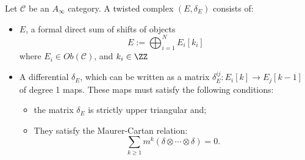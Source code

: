 
 
 
Let $\mathcal C$ be an $A_\infty$ category. A twisted complex $(E, \delta_E)$ consists of:
\begin{itemize}
\item $E$, a formal direct sum of shifts of objects
\[E:=\bigoplus_{i=1}^N E_i[k_i]\]
where $E_{i}\in Ob(\mathcal C)$, and $k_i\in \ZZ$
\item  A differential $\delta_E$, which can be written as a matrix  $\delta^{ij}_E: E_i[k]\to E_j[k-1]$ of degree 1 maps. These maps must satisfy the following conditions:
\begin{itemize}
    \item the matrix $\delta_E$ is strictly upper triangular and;
    \item They satisfy the Maurer-Cartan relation:
    \[\sum_{k\geq 1} m^k (\delta\otimes\cdots \otimes \delta) =0.\]
\end{itemize}
\end{itemize}

 